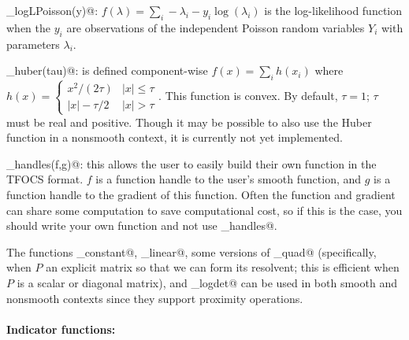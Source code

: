 \documentclass{article}
\newcommand\thalf{{\textstyle\frac{1}{2}}}
\newcommand{\<}{\langle}
\renewcommand{\>}{\rangle}
\begin{document}
\begin{trivlist}
\item \verb@smooth_logLPoisson(y)@: $f(\lambda) = \sum_i -\lambda_i - y_i \log( \lambda_i )$
    is the log-likelihood function when the $y_i$ are observations of the independent
    Poisson random variables $Y_i$ with parameters $\lambda_i$.
\item \verb@smooth_huber(tau)@: is defined component-wise $f(x) = \sum_i h(x_i)$ where $h(x) = \begin{cases} x^2/(2\tau) & |x| \le \tau \\
        |x| - \tau/2 & |x| > \tau \end{cases}.$
        This function is convex.
        By default, $\tau=1$; $\tau$ must be real and positive.
        Though it may be possible to also use the Huber function in a nonsmooth context,
        it is currently not yet implemented.
\item \verb@smooth_handles(f,g)@: this allows the user to easily build their own function in the TFOCS format.  $f$ is a function handle to the user's smooth function, and $g$ is a function handle to the gradient of this function.  Often the function and gradient can share some computation to save computational cost, so if this is the case, you should write your own function and not use \verb@smooth_handles@.
\end{trivlist}
The functions \verb@smooth_constant@, \verb@smooth_linear@, %
some versions of \verb@smooth_quad@ (specifically, when $P$ an explicit matrix so that we can form
its resolvent; this is efficient when $P$ is a scalar or diagonal matrix),
and \verb@smooth_logdet@
can be used in both smooth and nonsmooth contexts since they support proximity operations.


\paragraph{Indicator functions:} \label{sec:prox}
\end{document}
